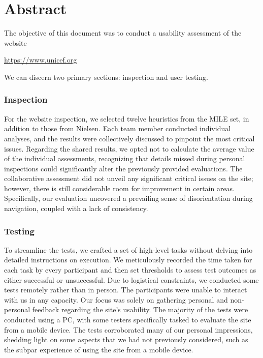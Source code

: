 \section{Abstract}
The objective of this document was to conduct a usability assessment of the website
\begin{center}
    \url{https://www.unicef.org}
\end{center}
We can discern two primary sections: inspection and user testing. 
\subsubsection{Inspection}
For the website inspection, we selected twelve heuristics from the MILE set, in addition to those from Nielsen.
Each team member conducted individual analyses, and the results were collectively discussed to pinpoint the most critical issues.
Regarding the shared results, we opted not to calculate the average value of the individual assessments, recognizing that details missed during personal inspections could significantly alter the previously provided evaluations.
The collaborative assessment did not unveil any significant critical issues on the site; however, there is still considerable room for improvement in certain areas.
Specifically, our evaluation uncovered a prevailing sense of disorientation during navigation, coupled with a lack of consistency.

\subsubsection{Testing}
To streamline the tests, we crafted a set of high-level tasks without delving into detailed instructions on execution. 
We meticulously recorded the time taken for each task by every participant and then set thresholds to assess test outcomes as either successful or unsuccessful. 
Due to logistical constraints, we conducted some tests remotely rather than in person.
The participants were unable to interact with us in any capacity. Our focus was solely on gathering personal and non-personal feedback regarding the site's usability.
The majority of the tests were conducted using a PC, with some testers specifically tasked to evaluate the site from a mobile device.
The tests corroborated many of our personal impressions, shedding light on some aspects that we had not previously considered, such as the subpar experience of using the site from a mobile device.